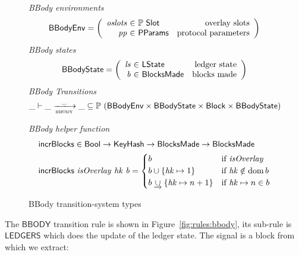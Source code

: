 \begin{figure}
  \emph{BBody environments}
  \begin{equation*}
    \BBodyEnv =
    \left(
      \begin{array}{r@{~\in~}lr}
        \var{oslots} & \powerset{\Slot} & \text{overlay slots} \\
        \var{pp} & \PParams & \text{protocol parameters} \\
      \end{array}
    \right)
  \end{equation*}
  \emph{BBody states}
  \begin{equation*}
    \BBodyState =
    \left(
      \begin{array}{r@{~\in~}lr}
        \var{ls} & \LState & \text{ledger state} \\
        \var{b} & \BlocksMade & \text{blocks made} \\
      \end{array}
    \right)
  \end{equation*}
  \emph{BBody Transitions}
  \begin{equation*}
    \_ \vdash \var{\_} \trans{bbody}{\_} \var{\_} \subseteq
    \powerset (\BBodyEnv \times \BBodyState \times \Block \times \BBodyState)
  \end{equation*}
  \caption{BBody transition-system types}
  \label{fig:ts-types:bbody}
  \emph{BBody helper function}
  \begin{align*}
      & \mathsf{incrBlocks} \in \mathsf{Bool} \to \mathsf{KeyHash} \to
          \mathsf{BlocksMade} \to \mathsf{BlocksMade} \\
      & \mathsf{incrBlocks}~\mathit{isOverlay}~\mathit{hk}~\mathit{b} =
        \begin{cases}
          b & \text{if }\mathit{isOverlay} \\
          b\cup\{\mathit{hk}\mapsto 1\} & \text{if }\mathit{hk}\notin\operatorname{dom}{b} \\
          b\mathbin{\underrightarrow\cup}\{\mathit{hk}\mapsto n+1\} & \text{if }\mathit{hk}\mapsto n\in b \\
        \end{cases}
  \end{align*}

\end{figure}

The $\mathsf{BBODY}$ transition rule is shown in Figure~\ref{fig:rules:bbody},
its sub-rule is $\mathsf{LEDGERS}$ which does the update of the ledger
state. The signal is a block from which we extract:

